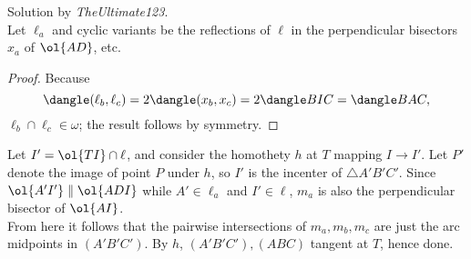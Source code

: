 \documentclass{seto}
\begin{document}
Solution by \emph{TheUltimate123}.\\[4pt] 
Let $\ell_a$ and cyclic variants be the reflections of $\ell$ in the perpendicular bisectors $x_a$ of $\ol{AD}$, etc. 
\begin{proof} Because \[\dangle(\ell_b,\ell_c)=2\dangle(x_b,x_c)=2\dangle
BIC=\dangle BAC,\] $\ell_b\cap\ell_c\in\omega$; the result follows by
symmetry.\end{proof} Let $I'=\ol{TI}\cap\ell$, and consider the homothety $h$ at
$T$ mapping $I\to I'$. Let $P'$ denote the image of point $P$ under $h$, so $I'$
is the incenter of $\triangle A'B'C'$. Since $\ol{A'I'}\parallel\ol{ADI}$ while
$A'\in\ell_a$ and $I'\in\ell$, $m_a$ is also the perpendicular bisector of
$\ol{AI}$.\\[4pt] 
From here it follows that the pairwise intersections of $m_a,m_b,m_c$ are just
the arc midpoints in $(A'B'C')$. By $h$, $(A'B'C'),(ABC)$ tangent at $T$, hence
done.
\end{document}

